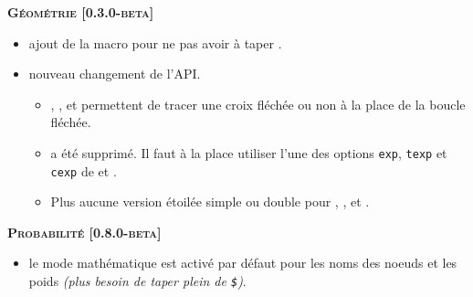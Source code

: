 \documentclass[12pt,a4paper]{book}
\begin{document}
\begin{description}
    
    \begin{center}
        \textbf{\textsc{Géométrie [0.3.0-beta]}}
    \end{center}
    
    \begin{itemize}[itemsep=.5em]
        \item {}
              ajout de la macro  pour ne pas avoir à taper .
    
    
        \item {} nouveau changement de l'API.
        \begin{itemize}[itemsep=.5em]
            \item {}, ,  et  permettent de tracer une croix fléchée ou non à la place de la boucle fléchée.
    
            \item {} a été supprimé. Il faut à la place utiliser l'une des options \verb#exp#, \verb#texp# et \verb#cexp# de  et .
    
            \item Plus aucune version étoilée simple ou double pour , ,  et .
        \end{itemize}
    
    
    \end{itemize}
    
    
    \separation
    
    
    
    
    \begin{center}
        \textbf{\textsc{Probabilité [0.8.0-beta]}}
    \end{center}
    
    \begin{itemize}[itemsep=.5em]
        \item {}
              le mode mathématique est activé par défaut pour les noms des noeuds et les poids \emph{(plus besoin de taper plein de \texttt{\$})}.
    \end{itemize}
    

\end{description}
\end{document}
